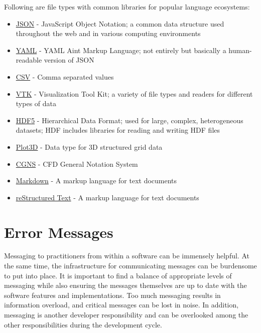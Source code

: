 \documentclass[]{nlr}
\begin{document}
Following are file types with common libraries for popular language ecosystems:
\begin{itemize}
\item \href{https://developer.mozilla.org/en-US/docs/Learn/JavaScript/Objects/JSON}{JSON} - JavaScript
    Object Notation; a common data structure used throughout the web and in various
    computing environments
\item \href{https://yaml.org}{YAML} - YAML Aint Markup Language; not entirely but basically a
    human-readable version of JSON
\item \href{https://en.wikipedia.org/wiki/Comma-separated_values}{CSV} - Comma separated values
\item \href{https://examples.vtk.org/site/VTKFileFormats/}{VTK} - Visualization Tool Kit; a variety of
    file types and readers for different types of data
\item \href{https://portal.hdfgroup.org/display/HDF5/HDF5}{HDF5} - Hierarchical Data Format; used for large,
    complex, heterogeneous datasets; HDF includes libraries for reading and writing HDF files
\item \href{https://github.com/nasa/Plot3D_utilities}{Plot3D} - Data type for 3D structured grid data
\item \href{https://cgns.github.io/WhatIsCGNS.html}{CGNS} - CFD General Notation System
\item \href{https://www.markdownguide.org/getting-started/}{Markdown} - A markup language for text documents
\item \href{https://docutils.sourceforge.io/rst.html}{reStructured Text} - A markup language for text
    documents
\end{itemize}

\section{Error Messages}
Messaging to practitioners from within a software can be immensely helpful.
At the same time, the infrastructure for communicating messages can be burdensome to put into place.
It is important to find a balance of appropriate levels of messaging while also ensuring
the messages themselves are up to date with the software features and implementations.
Too much messaging results in information overload, and critical messages can be lost in noise.
In addition, messaging is another developer responsibility and can be overlooked among the
other responsibilities during the development cycle.
\end{document}
